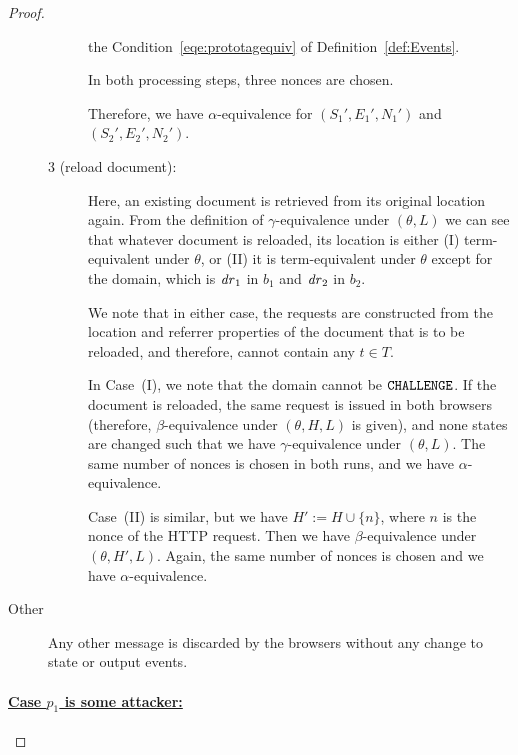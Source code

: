 \begin{proof}
\begin{description}
\begin{description}
        the Condition~\ref{eqe:prototagequiv} of 
        Definition~\ref{def:Events}.
  
        In both processing steps, three nonces are chosen.
  
        Therefore, we have $\alpha$-equivalence for $(S_1',E_1',N_1')$
        and $(S_2',E_2',N_2')$.
        \item[3 (reload document):]
        Here, an existing document is
        retrieved from its original location again. From the definition
        of $\gamma$-equivalence under $(\theta,L)$ we can see that
        whatever document is reloaded, its location is either (I)
        term-equivalent under $\theta$, or (II) it is term-equivalent
        under $\theta$ except for the domain, which is $\mathit{dr}_1$ in
        $b_1$ and $\mathit{dr}_2$ in $b_2$. 
  
        We note that in either case, the requests are constructed from
        the location and referrer properties of the document that is to
        be reloaded, and therefore, cannot contain any $t\in T$.
  
        In Case~(I), we note that the domain cannot be
        $\mathtt{CHALLENGE}$. If the document is reloaded, the same 
        request is issued in both browsers (therefore,
        $\beta$-equivalence under $(\theta, H, L)$ is given), and 
        none states are changed such that we have
        $\gamma$-equivalence under $(\theta, L)$. The same number of
        nonces is chosen in both runs, and we have
        $\alpha$-equivalence.
  
        Case~(II) is similar, but we have $H' := H \cup \{n\}$, where
        $n$ is the nonce of the HTTP request. 
        Then we have $\beta$-equivalence under
        $(\theta,H',L)$. Again, the same number of nonces is chosen and
        we have $\alpha$-equivalence. 
        \end{description}
      \item[Other] Any other message is discarded by the browsers 
        without any change to state or output events.
    \end{description}
  
    \paragraph{\underline{Case $p_1$ is some attacker:}}


\end{proof}
